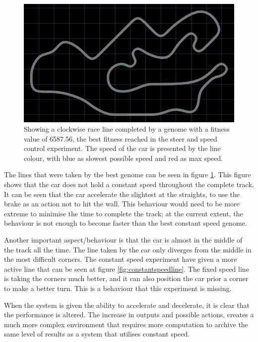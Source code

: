 \begin{figure}[h]
\includegraphics[width=\textwidth]{report/images/normal_generation_6558}
\centering
\caption{Showing a clockwise race line completed by a genome with a fitness value of 6587.56, the best fitness reached in the steer and speed control experiment. The speed of the car is presented by the line colour, with blue as slowest possible speed and red as max speed.}
\label{fig:steerspeedline}
\end{figure}

The lines that were taken by the best genome can be seen in figure \ref{fig:steerspeedline}. This figure shows that the car does not hold a constant speed throughout the complete track. It can be seen that the car accelerate the slightest at the straights, to use the brake as an action not to hit the wall. This behaviour would need to be more extreme to minimise the time to complete the track; at the current extent, the behaviour is not enough to become faster than the best constant speed genome.

Another important aspect/behaviour is that the car is almost in the middle of the track all the time. The line taken by the car only diverges from the middle in the most difficult corners. The constant speed experiment have given a more active line that can be seen at figure \ref{fig:constantspeedline}. The fixed speed line is taking the corners much better, and it can also position the car prior a corner to make a better turn. This is a behaviour that this experiment is missing.

When the system is given the ability to accelerate and decelerate, it is clear that the performance is altered. The increase in outputs and possible actions, creates a much more complex environment that requires more computation to archive the same level of results as a system that utilises constant speed. 


